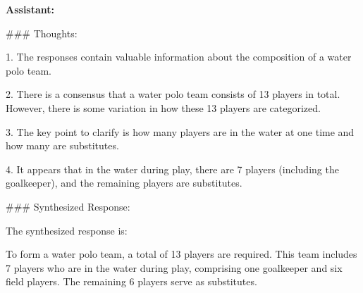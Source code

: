 \begin{center}
	\small
	\begin{tcolorbox}[width=1\linewidth,title={\textbf{An Example ICL Demonstration of StrategyQA for Aggregators: Assistant Response}}]

\textbf{Assistant:}

\#\#\# Thoughts:

1. The responses contain valuable information about the composition of a water polo team. 

2. There is a consensus that a water polo team consists of 13 players in total. However, there is some variation in how these 13 players are categorized.

3. The key point to clarify is how many players are in the water at one time and how many are substitutes.

4. It appears that in the water during play, there are 7 players (including the goalkeeper), and the remaining players are substitutes.

\#\#\# Synthesized Response:

The synthesized response is: 

To form a water polo team, a total of 13 players are required. This team includes 7 players who are in the water during play, comprising one goalkeeper and six field players. The remaining 6 players serve as substitutes.

	\end{tcolorbox}
\end{center}